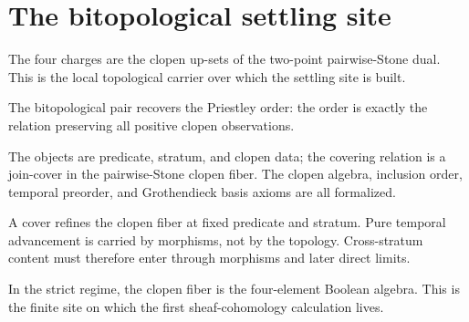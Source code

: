 \section{The bitopological settling site}

\begin{proposition}\label{thm:four-priestley-dual}\leanok{}
The four charges are the clopen up-sets of the two-point pairwise-Stone dual.
This is the local topological carrier over which the settling site is built.
\end{proposition}

\begin{theorem}\label{thm:pairwise-stone-order-recovery}\leanok{}
The bitopological pair recovers the Priestley order: the order is exactly the
relation preserving all positive clopen observations.
\end{theorem}

\begin{theorem}\label{thm:bitopological-site-grothendieck}\leanok{}
The objects are predicate, stratum, and clopen data; the covering relation is a
join-cover in the pairwise-Stone clopen fiber.  The clopen algebra, inclusion
order, temporal preorder, and Grothendieck basis axioms are all formalized.
\end{theorem}

\begin{theorem}\label{thm:no-temporal-covers}\leanok{}
A cover refines the clopen fiber at fixed predicate and stratum.  Pure temporal
advancement is carried by morphisms, not by the topology.  Cross-stratum
content must therefore enter through morphisms and later direct limits.
\end{theorem}

\begin{theorem}\label{thm:strict-site-finite-fiber}\leanok{}
In the strict regime, the clopen fiber is the four-element Boolean algebra.
This is the finite site on which the first sheaf-cohomology calculation lives.
\end{theorem}
